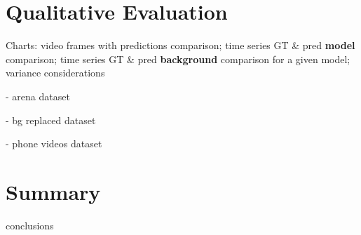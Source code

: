 


\section{Qualitative Evaluation}
\label{sec:evaluation-qualitative}

Charts: video frames with predictions comparison; time series GT \& pred \textbf{model} comparison; time series GT \& pred \textbf{background} comparison for a given model; variance considerations

- arena dataset

- bg replaced dataset

- phone videos dataset


\section{Summary}
\label{sec:evaluation-summary}

conclusions